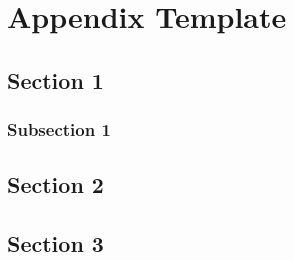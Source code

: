 %
%
%


\chapter{Appendix Template}
\label{AppendixTemplate} %


\section{Section 1}
\subsection{Subsection 1}


\section{Section 2}


\section{Section 3}


